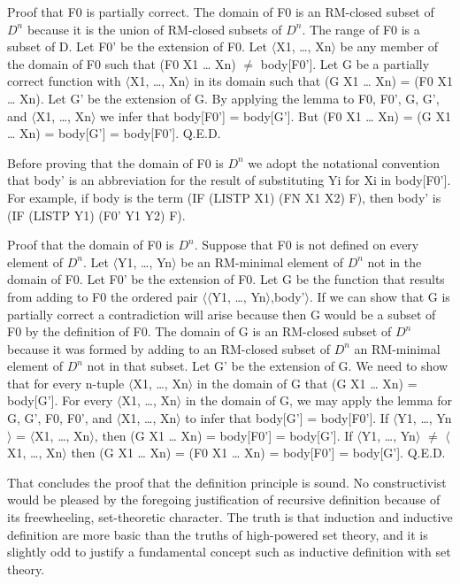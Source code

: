 \documentclass[10pt]{book}
\begin{document}
Proof that F0 is partially correct.  The domain of F0 is an RM-closed
subset of $D^{n}$ because it is the union of RM-closed subsets of $D^{n}$.
The range of F0 is a subset of D.  Let F0' be the extension of F0.
Let $\langle$X1, \ldots{}, Xn$\rangle$ be any member of the domain of F0 such that
(F0 X1 \ldots{} Xn)  $\neq$  body[F0'].  Let G be a partially
correct function with $\langle$X1, \ldots{}, Xn$\rangle$ in its domain such that
(G X1 \ldots{} Xn) = (F0 X1 \ldots{} Xn).  Let G' be the extension of G.
By applying the lemma to F0, F0', G, G', and $\langle$X1, \ldots{}, Xn$\rangle$
we infer that body[F0'] = body[G'].  But (F0 X1 \ldots{} Xn) =
(G X1 \ldots{} Xn) = body[G'] = body[F0'].  Q.E.D.

Before proving that the domain of F0 is $D^{n}$ we adopt the notational
convention that body' is an abbreviation for the result of substituting
Yi for Xi in body[F0'].  For example, if body is the term
(IF (LISTP X1) (FN X1 X2) F), then body' is (IF (LISTP Y1) (F0' Y1 Y2) F).

Proof that the domain of F0 is $D^{n}$.  Suppose that F0 is not defined on
every element of $D^{n}$.  Let $\langle$Y1, \ldots{}, Yn$\rangle$ be an RM-minimal
element of $D^{n}$ not in the domain of F0.  Let F0' be the
extension of F0.  Let G be the function that results from adding to
F0 the ordered pair $\langle \langle$Y1, \ldots{}, Yn$\rangle$,body'$\rangle$.  If we can show that
G is partially correct a contradiction will arise because then G would
be a subset
of F0 by the definition of F0.  The domain of G is an RM-closed subset of $D^{n}$
because it was formed by adding to an RM-closed subset of $D^{n}$
an RM-minimal element of $D^{n}$ not in that subset.
Let G' be the extension of G.
We need to show that for every n-tuple $\langle$X1, \ldots{}, Xn$\rangle$ in the domain of G that (G X1 \ldots{} Xn)
= body[G'].  For every $\langle$X1, \ldots{}, Xn$\rangle$ in the domain of G, we may apply the
lemma for G, G', F0, F0', and $\langle$X1, \ldots{}, Xn$\rangle$ to infer that body[G'] =
body[F0'].  If $\langle$Y1, \ldots{}, Yn$\rangle$ = $\langle$X1, \ldots{}, Xn$\rangle$, then (G X1 \ldots{} Xn) =
body[F0'] = body[G'].  If $\langle$Y1, \ldots{}, Yn$\rangle$ $\neq$ $\langle$X1, \ldots{}, Xn$\rangle$ then
(G X1 \ldots{} Xn) = (F0 X1 \ldots{} Xn) = body[F0'] = body[G'].
Q.E.D.

That concludes the proof that the definition
principle is sound.  No constructivist would
be pleased by the foregoing justification of recursive
definition because of its freewheeling, set-theoretic
character.  The truth is that induction and inductive
definition are more basic than the truths of
high-powered set theory, and it is slightly odd
to justify a fundamental concept such
as inductive definition with set theory.
\end{document}
